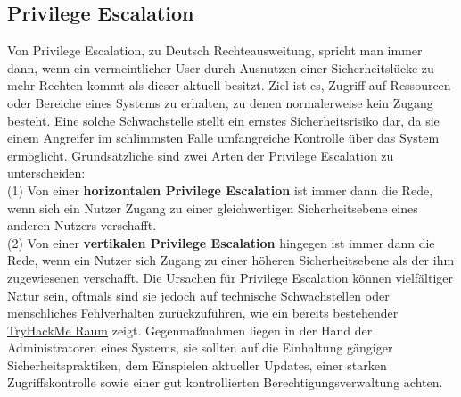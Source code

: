 \documentclass[10pt, a4paper,onecolumn ,titlepage]{article}
\begin{document}
    \subsection{Privilege Escalation}
    \label{subsec:PrivilegeEscalation}
    Von Privilege Escalation, zu Deutsch Rechteausweitung, spricht man immer dann, wenn ein vermeintlicher User durch Ausnutzen einer Sicherheitslücke zu mehr Rechten kommt als dieser aktuell besitzt.
    Ziel ist es, Zugriff auf Ressourcen oder Bereiche eines Systems zu erhalten, zu denen normalerweise kein Zugang besteht.
    Eine solche Schwachstelle stellt ein ernstes Sicherheitsrisiko dar, da sie einem Angreifer im schlimmsten Falle umfangreiche Kontrolle über das System ermöglicht.
    Grundsätzliche sind zwei Arten der Privilege Escalation zu unterscheiden:
    \\
    (1) Von einer \textbf{horizontalen Privilege Escalation} ist immer dann die Rede, wenn sich ein Nutzer Zugang zu einer gleichwertigen Sicherheitsebene eines anderen Nutzers verschafft.
    \\
    (2) Von einer \textbf{vertikalen Privilege Escalation} hingegen ist immer dann die Rede, wenn ein Nutzer sich Zugang zu einer höheren Sicherheitsebene als der ihm zugewiesenen verschafft\parencite{privilegeEscalationArten}.
    Die Ursachen für Privilege Escalation können vielfältiger Natur sein, oftmals sind sie jedoch auf technische Schwachstellen oder menschliches Fehlverhalten zurückzuführen, wie ein bereits bestehender \href{https://tryhackme.com/room/linprivesc}{TryHackMe Raum} zeigt.
    Gegenmaßnahmen liegen in der Hand der Administratoren eines Systems, sie sollten auf die Einhaltung gängiger Sicherheitspraktiken, dem Einspielen aktueller Updates, einer starken Zugriffskontrolle sowie einer gut kontrollierten Berechtigungsverwaltung achten.
\end{document}
